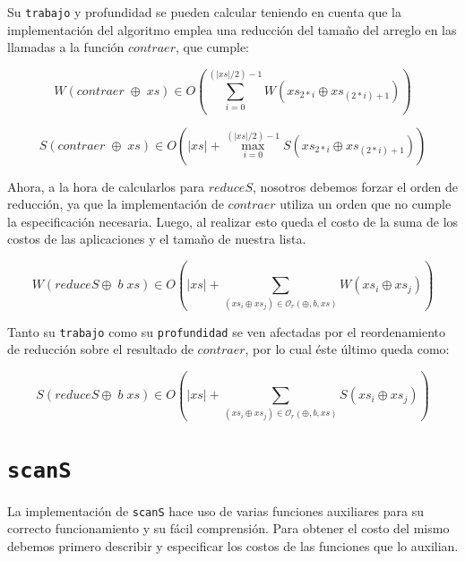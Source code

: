 \documentclass[a4paper,10pt]{article}
\begin{document}
    Su \texttt{trabajo} y profundidad se pueden calcular teniendo en cuenta 
que la implementación del algoritmo emplea una reducción del tamaño del 
arreglo en las llamadas a la función $contraer$, que cumple:

\begin{equation*}
    W \left( contraer\; \oplus \;xs \right) \in
    O \left( \sum_{i=0}^{(\vert xs \vert /2 )-1} W \left( xs_{2*i} \oplus xs_{(2*i) +1} \right) \right)
\end{equation*}

\begin{equation*}
    S \left( contraer\; \oplus \;xs \right) \in
    O \left( \vert xs \vert + \max_{i=0}^{(\vert xs \vert /2 )-1} S \left( xs_{2*i} \oplus xs_{(2*i) +1} \right) \right)
\end{equation*}

\bigskip

    Ahora, a la hora de calcularlos para $reduceS$, nosotros debemos forzar
el orden de reducción, ya que la implementación de $contraer$ utiliza un orden
que no cumple la especificación necesaria. Luego, al realizar esto queda el costo
de la suma de los costos de las aplicaciones y el tamaño de nuestra lista.

\begin{equation*}
    W \left( reduceS \oplus \; b \; xs \right) \in
    O \left( \vert xs \vert + \sum_{(xs_i \oplus xs_j) \in \mathcal{O}_r(\oplus,b,xs)} W \left( xs_i \oplus xs_j \right) \right)
\end{equation*}

\bigskip

    Tanto su \texttt{trabajo} como su \texttt{profundidad} se ven afectadas por
el reordenamiento de reducción sobre el resultado de $contraer$, por lo cual éste
último queda como:

\begin{equation*}
    S \left( reduceS \oplus \; b \; xs \right) \in
    O \left( \vert xs \vert + \sum_{(xs_i \oplus xs_j) \in \mathcal{O}_r(\oplus,b,xs)} S \left( xs_i \oplus xs_j \right) \right)
\end{equation*}


\bigskip

\section*{\texttt{scanS}}

    La implementación de \texttt{scanS} hace uso de varias funciones auxiliares
para su correcto funcionamiento y su fácil comprensión. Para obtener el costo del
mismo debemos primero describir y especificar los costos de las funciones que lo 
auxilian.
\end{document}
